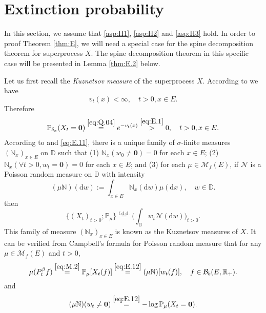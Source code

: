 \documentclass[12pt,a4paper]{amsart}
\numberwithin{equation}{section}
\theoremstyle{plain}
\theoremstyle{definition}
\theoremstyle{remark}
\begin{document}
	\section{Extinction probability} \label{sec:E}
	In this section, we assume that \eqref{asp:H1}, \eqref{asp:H2} and \eqref{asp:H3} hold. 
	In order to proof Theorem \ref{thm:E}, we will need a special case for the spine decomposition theorem for superprocess $X$.
	The spine decomposition theorem in this specific case will be presented in Lemma \ref{thm:E.2} below.
	
	Let us first recall the \emph{Kuznetsov  measure} of the superprocess $X$. 
	According to \cite[Proposition 1.3]{LiuRenSongSun2020} we have 
\begin{equation} \label{eq:E.1}
	v_t(x)<\infty, \quad t>0, x\in E.
\end{equation}
	Therefore 
\begin{align} \label{eq:E.11}
	\mathbb P_{\delta_x}(X_t = \mathbf 0) \overset{\eqref{eq:Q.04}}= e^{-v_t(x)}\overset{\eqref{eq:E.1}} > 0, \quad t>0, x\in E.
\end{align}
	According to \cite[Section 8.4]{Li2011Measure-valued} and \eqref{eq:E.11}, there is a unique family of $\sigma$-finite measures $(\mathbb N_x)_{x\in E}$ on $\mathbb D$ such that 
	(1) $\mathbb N_x(w_0 \neq \mathbf 0) = 0$ for each $x\in E$;
	(2) $\mathbb N_x (\forall t > 0, w_t =\mathbf 0) =0$ for each $x\in E$; 
	and (3) for each $\mu \in \mathcal M_f(E)$, if $\mathcal N$ is a Poisson random measure on $\mathbb D$ with intensity
	\[
	(\mu\mathbb N)(\mathrm dw):= \int_{x\in E} \mathbb N_x(\mathrm dw)\mu(\mathrm dx), \quad w\in \mathbb D.
	\]
	then
	\begin{equation} \label{eq:E.12}
	\{(X_t)_{t> 0};\mathbb P_\mu\}
	\overset{\text{f.d.d.}}= \Big(\int_{\mathbb D} w_t\mathcal N(\mathrm dw)\Big)_{t> 0}.
	\end{equation}
	This family of measure $(\mathbb N_x)_{x\in E}$ is known as the Kuznetsov measures of $X$.
	It can be verified from Campbell's formula for Poisson random measure that for any $\mu\in \mathcal M_f(E)$ and $t>0$,
\begin{equation} \label{eq:E.13}
	\mu(P_t^\beta f) 
	\overset{\eqref{eq:M.2}}= \mathbb P_\mu[X_t(f)]
	\overset{\eqref{eq:E.12}}=(\mu \mathbb N) [w_t(f)], 
	\quad f\in \mathcal B_b(E, \mathbb R_+).
\end{equation}
	and 
\begin{equation} \label{eq:E.14}
	(\mu\mathbb N) (w_t\neq \mathbf 0) 
	\overset{\eqref{eq:E.12}} = - \log \mathbb P_{\mu}(X_t = \mathbf 0). 
\end{equation}
\end{document}
